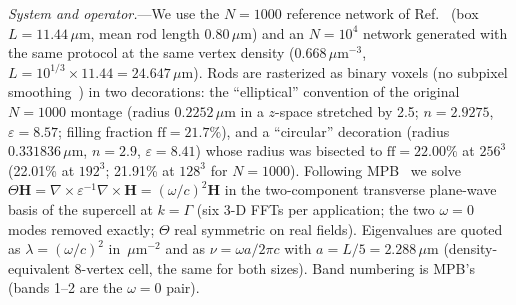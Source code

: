 \documentclass[prl,twocolumn,superscriptaddress,showpacs]{revtex4-2}
\newcommand{\um}{\,\mu\mathrm{m}}
\newcommand{\umi}{\,\mu\mathrm{m}^{-2}}
\begin{document}
\emph{System and operator.}---We use the $N=1000$ reference network of Ref.~\cite{Sellers2017} (box $L=11.44\um$, mean rod length $0.80\um$) and an $N=10^4$ network generated with the same protocol at the same vertex density ($0.668\um^{-3}$, $L=10^{1/3}\times11.44=24.647\um$). Rods are rasterized as binary voxels (no subpixel smoothing~\cite{Farjadpour2006,Kottke2008}) in two decorations: the ``elliptical'' convention of the original $N=1000$ montage (radius $0.2252\um$ in a $z$-space stretched by 2.5; $n=2.9275$, $\varepsilon=8.57$; filling fraction $\mathrm{ff}=21.7\%$), and a ``circular'' decoration (radius $0.331836\um$, $n=2.9$, $\varepsilon=8.41$) whose radius was bisected to $\mathrm{ff}=22.00\%$ at $256^3$ (22.01\% at $192^3$; 21.91\% at $128^3$ for $N=1000$). Following MPB~\cite{Johnson2001} we solve $\Theta\bm H=\nabla\times\varepsilon^{-1}\nabla\times\bm H=(\omega/c)^2\bm H$ in the two-component transverse plane-wave basis of the supercell at $k=\Gamma$ (six 3-D FFTs per application; the two $\omega=0$ modes removed exactly; $\Theta$ real symmetric on real fields). Eigenvalues are quoted as $\lambda=(\omega/c)^2$ in $\umi$ and as $\nu=\omega a/2\pi c$ with $a=L/5=2.288\um$ (density-equivalent 8-vertex cell, the same for both sizes). Band numbering is MPB's (bands 1--2 are the $\omega=0$ pair).
\end{document}
